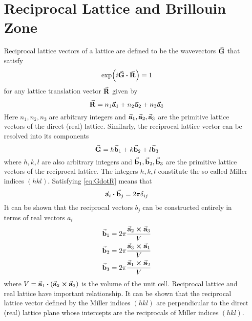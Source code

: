 \appendix

\makeatletter
\renewcommand{\@makechapterhead}[1]{\vspace *{-10\p@ }{\parindent \z@
		\raggedright \normalfont \ifnum \c@secnumdepth >\m@ne \Huge \bfseries
			\@chapapp \space \thechapter \vskip 10\p@ \fi #1\par \nobreak \vskip 30\p@ }}
\makeatother

\chapter{Reciprocal Lattice and Brillouin Zone}\label{chap:BZ}
Reciprocal lattice vectors of a lattice are defined to be the wavevectors  $\va{G}$ that satisfy
\begin{equation} \label{eq:GdotR}
	\exp(i \va{G} \vdot \va{R} ) = 1
\end{equation}
for any lattice translation vector $\va{R}$ given by
\begin{equation}
	\va{R} = n_1 \va{a}_1 + n_2 \va{a}_2 +n_3 \va{a}_3
\end{equation}
Here $n_1, n_2, n_3$ are arbitrary integers and $\va{a}_1, \va{a}_2, \va{a}_3$ are the primitive lattice vectors of the direct (real) lattice. Similarly, the reciprocal lattice vector can be resolved into its components
\begin{equation}
	\va{G} = h \va{b}_1 + k \va{b}_2 + l \va{b}_3
\end{equation}
where $h, k, l$ are also  arbitrary integers and $\va{b}_1, \va{b}_2, \va{b}_3$ are the primitive lattice vectors of the reciprocal lattice. The integers $h, k, l$ constitute the so called Miller indices $(hkl)$. Satisfying \eqref{eq:GdotR} means that
\begin{equation*}
	\va{a}_i \vdot \va{b}_j = 2 \pi \delta_{ij}
\end{equation*}
It can be shown that the reciprocal vectors $b_j$ can be constructed entirely in terms of real vectors $a_i$
\begin{align}
	\va{b}_1 & = 2 \pi \frac{\va{a}_2 \crossproduct \va{a}_3}{V} \notag                  \\
	\va{b}_2 & = 2 \pi \frac{\va{a}_3 \crossproduct \va{a}_1}{V} \label{eq:recipro_real} \\
	\va{b}_3 & = 2 \pi \frac{\va{a}_1 \crossproduct \va{a}_2}{V} \notag
\end{align}
where $V = \va{a}_1 \vdot (\va{a}_2 \crossproduct \va{a}_3)$ is the volume of the unit cell. Reciprocal lattice and real lattice have important relationship. It can be shown that the reciprocal lattice vector defined by the Miller indices $(hkl)$ are perpendicular to the direct (real) lattice plane whose intercepts are the reciprocals of Miller indices $(hkl)$.

